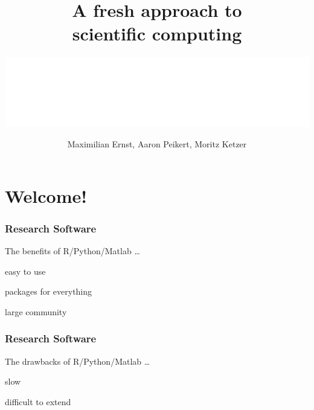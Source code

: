 \documentclass[notes]{beamer}
\title{\Huge A fresh approach to \\ scientific computing}
\date{Maximilian Ernst, Aaron Peikert, Moritz Ketzer}
\author{\includegraphics[width=.49\textwidth]{figures/mpib_logo/MPIB_Logo_EN_horizontal_RGB_White.png}}
\def\\{}%
\newenvironment{wideitemize}{
    \itemize\addtolength{\itemsep}{15pt}\addtolength{\topsep}{10pt}}{\enditemize}
\begin{document}
	\setcounter{showProgressBar}{0}
	\setcounter{showSlideNumbers}{0}

	{
    }

    {
	\frame{
	\titlepage}
	}

	\setcounter{showProgressBar}{0}
	\setcounter{showSlideNumbers}{0}

	\section{Welcome!}

    \begin{frame}
    \frametitle{Research Software}
    The benefits of R/Python/Matlab \ldots
    \vspace{1cm}
        \begin{wideitemize}
            \item easy to use
            \item packages for everything
            \item large community
        \end{wideitemize}
    \end{frame}

    \begin{frame}
    \frametitle{Research Software}
    The drawbacks of R/Python/Matlab \ldots
    \vspace{1cm}
        \begin{wideitemize}
            \item slow
            \item difficult to extend
        \end{wideitemize}
    \end{frame}
\end{document}
